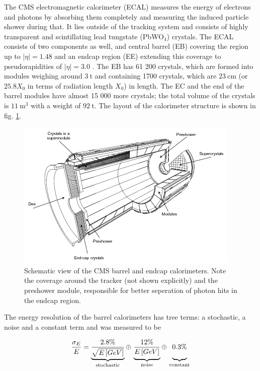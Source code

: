 
The CMS electromagnetic calorimeter (ECAL) measures the energy of electrons and photons by absorbing them completely and measuring the induced particle shower during that. It lies outside of the tracking system and consists of highly transparent and scintillating lead tungstate (PbWO$_4$) crystals. The ECAL consists of two components as well, and central barrel (EB) covering the region up to $|\eta| = 1.48$ and an endcap region (EE) extending this coverage to pseudorapidities of $|\eta| = 3.0$ \cite{Biino_2015}. The EB has 61 200 crystals, which are formed into modules weighing around $\SI{3}{\tonne}$ and containing 1700 crystals, which are $\SI{23}{\centi\meter}$ (or $25.8 X_0$ in terms of radiation length $X_0$) in length. The EC and the end of the barrel modules have almost 15 000 more crystals; the total volume of the crystals is $\SI{11}{\cubic\meter}$ with a weight of $\SI{92}{\tonne}$. The layout of the calorimeter structure is shown in fig. \ref{fig:ecal}.

\begin{figure}[h!]
	\centering
	\includegraphics[width=0.6\linewidth]{figures/experiment/ecal.png}
	\caption{Schematic view of the CMS barrel and endcap calorimeters. Note the coverage around the tracker (not shown explicitly) and the preshower module, responsible for better seperation of photon hits in the endcap region. \cite{Chatrchyan:1554142}}
	\label{fig:ecal}
\end{figure}

The energy resolution of the barrel calorimeters has tree terms: a stochastic, a noise and a constant term and was measured to be \cite{Chatrchyan:1554142}

\begin{equation*}
	\frac{\sigma_E}{E} = \underbrace{\frac{2.8\%}{\sqrt{E\left[GeV\right]}}}_\text{stochastic} \oplus \, \underbrace{\vphantom{\frac{2.8\%}{\sqrt{E\left[GeV\right]}}}\frac{12\%}{E\left[GeV\right]}}_\text{noise} \oplus \, \underbrace{\vphantom{\frac{2.8\%}{\sqrt{E\left[GeV\right]}}}0.3\%}_\text{constant}
\end{equation*}

